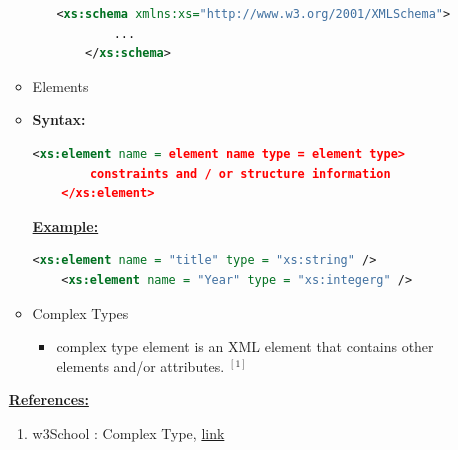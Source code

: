 \documentclass[12pt]{article}
\begin{document}
\begin{enumerate}[1.]
\begin{itemize}
\begin{itemize}
\begin{lstlisting}[language=XML]
    <xs:schema xmlns:xs="http://www.w3.org/2001/XMLSchema">
        ...
    </xs:schema>
    \end{lstlisting}

        \end{itemize}
        \item Elements
        \item \textbf{Syntax:}

        \bigskip

    \begin{lstlisting}[language=XML]
    <xs:element name = element name type = element type>
        constraints and / or structure information
    </xs:element>
    \end{lstlisting}

        \bigskip

        \underline{\textbf{Example:}}

        \bigskip

    \begin{lstlisting}[language=XML]
    <xs:element name = "title" type = "xs:string" />
    <xs:element name = "Year" type = "xs:integerg" />

    \end{lstlisting}

        \item Complex Types
        \begin{itemize}
            \item complex type element is an XML element that contains other elements and/or attributes. $^{[1]}$
        \end{itemize}
    \end{itemize}

    \bigskip

    \underline{\textbf{References:}}

    \bigskip

    \begin{enumerate}[1.]
        \item w3School : Complex Type, \href{https://www.w3schools.com/xml/el_complextype.asp}{link}
    \end{enumerate}





\end{enumerate}
\end{document}
